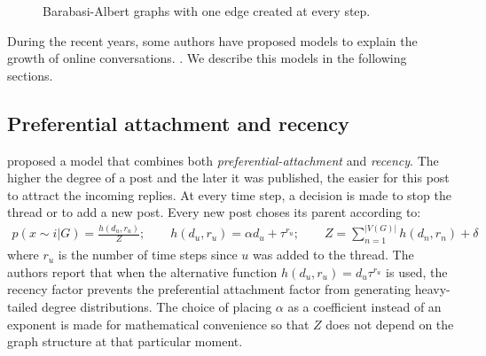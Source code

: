 \documentclass[smallextended]{svjour3}          %
\begin{document}
\begin{figure}
	\centering
	\caption{Barabasi-Albert graphs with one edge created at every step.}
	\label{fig:Barabasi-Albert}
\end{figure}



During the recent years, some authors have proposed models to explain the growth of online conversations. \citep{Kumar2010, Gomez2010, Wang2012e, Gomez2012}. We describe this models in the following sections.

\subsection{Preferential attachment and recency}
\cite{Kumar2010} proposed a model that combines both \textit{preferential-attachment} and \textit{recency}. The higher the degree of a post and the later it was published, the easier for this post to attract the incoming replies. At every time step, a decision is made to stop the thread or to add a new post. Every new post choses its parent according to:
\begin{align}
p(x\sim i | G) = \frac{h(d_u, r_u)}{Z}; \qquad h(d_u, r_u) =\alpha d_u + \tau^{r_u} ; \qquad Z = \sum_{n=1}^{|V(G)|} h(d_n, r_n) + \delta
\end{align}
where $r_u$ is the number of time steps since $u$ was added to the thread. The authors report that when the alternative function $h(d_u, r_u) = d_u \tau^{r_u}$ is used, the recency factor prevents the preferential attachment factor from generating heavy-tailed degree distributions. The choice of placing $\alpha$ as a coefficient instead of an exponent is made for mathematical convenience so that $Z$ does not depend on the graph structure at that particular moment.
\end{document}
